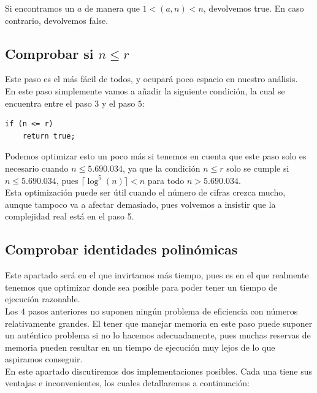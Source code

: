 Si encontramos un $a$ de manera que $1 < (a, n) < n$, devolvemos true. En caso contrario, devolvemos false.

\subsection{Comprobar si $n \leq r$}

Este paso es el más fácil de todos, y ocupará poco espacio en nuestro análisis.\\

En este paso simplemente vamos a añadir la siguiente condición, la cual se encuentra entre el paso $3$ y el paso $5$:\\

\begin{lstlisting}
if (n <= r)
	return true;
\end{lstlisting}

Podemos optimizar esto un poco más si tenemos en cuenta que este paso solo es necesario cuando $n \leq 5.690.034$, ya que la condición $n \leq r$ solo se cumple si $n \leq 5.690.034$, pues $\lceil \log^5(n) \rceil < n$ para todo $n > 5.690.034$.\\

Esta optimización puede ser útil cuando el número de cifras crezca mucho, aunque tampoco va a afectar demasiado, pues volvemos a insistir que la complejidad real está en el paso 5.

\subsection{Comprobar identidades polinómicas}

Este apartado será en el que invirtamos más tiempo, pues es en el que realmente tenemos que optimizar donde sea posible para poder tener un tiempo de ejecución razonable.\\

Los $4$ pasos anteriores no suponen ningún problema de eficiencia con números relativamente grandes. El tener que manejar memoria en este paso puede suponer un auténtico problema si no lo hacemos adecuadamente, pues muchas reservas de memoria pueden resultar en un tiempo de ejecución muy lejos de lo que aspiramos conseguir.\\

En este apartado discutiremos dos implementaciones posibles. Cada una tiene sus ventajas e inconvenientes, los cuales detallaremos a continuación:\\

